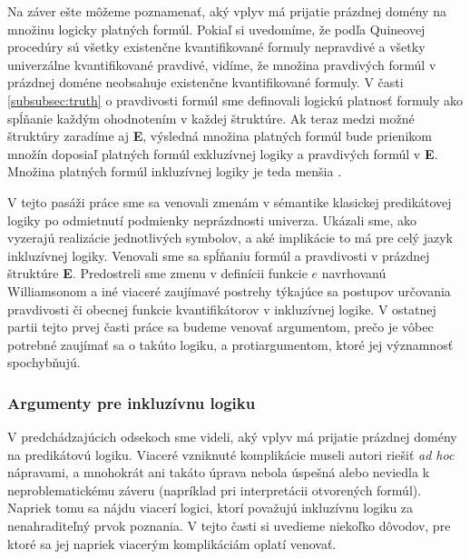 \documentclass[12pt, letterpaper]{article}
\begin{document}



Na záver ešte môžeme poznamenať, aký vplyv má prijatie prázdnej domény na množinu logicky platných formúl. Pokiaľ si uvedomíme, že podľa Quineovej procedúry sú všetky existenčne kvantifikované formuly nepravdivé a všetky univerzálne kvantifikované pravdivé, vidíme, že množina pravdivých formúl v prázdnej doméne neobsahuje existenčne kvantifikované formuly. V časti \ref{subsubsec:truth} o pravdivosti formúl sme definovali logickú platnosť formuly ako spĺňanie každým ohodnotením v každej štruktúre. Ak teraz medzi možné štruktúry zaradíme aj \textbf{E}, výsledná množina platných formúl bude prienikom množín doposiaľ platných formúl exkluzívnej logiky a pravdivých formúl v \textbf{E}. Množina platných formúl inkluzívnej logiky je teda menšia \parencites[172]{amer}[146]{mendelson_introduction_2015}.\par

V tejto pasáži práce sme sa venovali zmenám v sémantike klasickej predikátovej logiky po odmietnutí podmienky neprázdnosti univerza. Ukázali sme, ako vyzerajú realizácie jednotlivých symbolov, a aké implikácie to má pre celý jazyk inkluzívnej logiky. Venovali sme sa spĺňaniu formúl a pravdivosti v prázdnej štruktúre \textbf{E}. Predostreli sme zmenu v definícii funkcie $e$ navrhovanú Williamsonom a iné viaceré zaujímavé postrehy týkajúce sa postupov určovania pravdivosti či obecnej funkcie kvantifikátorov v inkluzívnej logike. V ostatnej partii tejto prvej časti práce sa budeme venovať argumentom, prečo je vôbec potrebné zaujímať sa o takúto logiku, a protiargumentom, ktoré jej významnosť spochybňujú.



\subsubsection{Argumenty pre inkluzívnu logiku}
V predchádzajúcich odsekoch sme videli, aký vplyv má prijatie prázdnej domény na predikátovú logiku. Viaceré vzniknuté komplikácie museli autori riešiť \textit{ad hoc} nápravami, a mnohokrát ani takáto úprava nebola úspešná alebo neviedla k neproblematickému záveru (napríklad pri interpretácii otvorených formúl). Napriek tomu sa nájdu viacerí logici, ktorí považujú inkluzívnu logiku za nenahraditeľný prvok poznania. V tejto časti si uvedieme niekoľko dôvodov, pre ktoré sa jej napriek viacerým komplikáciám oplatí venovať.\par
\end{document}
